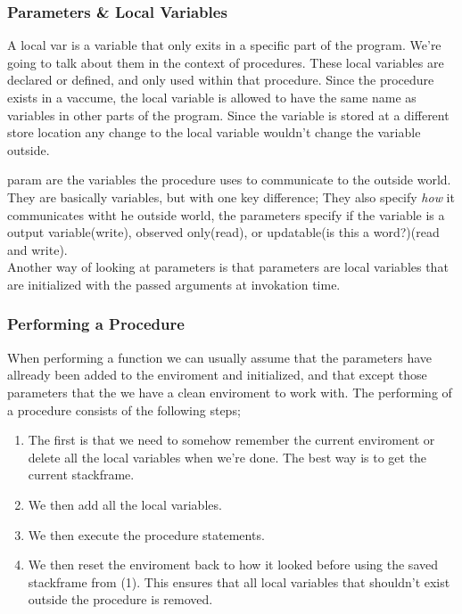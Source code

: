 \documentclass{article}
\begin{document}
    \subsubsection{Parameters \& Local Variables}
    A \gls{local var} is a variable that only exits in a specific part of the program. We're going to talk about them in the context of procedures.
    These local variables are declared or defined,  and only used within that procedure.
    Since the procedure exists in a vaccume, the local variable is allowed to have the same name as variables in other parts of the program. 
    Since the variable is stored at a different store location any change to the local variable wouldn't change the variable outside.

    \gls{param} are the variables the procedure uses to communicate to the outside world. They are basically variables, but with one key difference;
    They also specify \textit{how} it communicates witht he outside world, the parameters specify if the variable is a output variable(write), observed only(read), or updatable(is this a word?)(read and write).\\
    Another way of looking at parameters is that parameters are  local variables that are initialized with the passed arguments at invokation time.
    \subsubsection{Performing a Procedure}
        When performing a function we can usually assume that the parameters have allready been added to the enviroment and initialized, and that except those parameters that the we have a clean
        enviroment to work with.
        The performing of a procedure consists of the following steps;
        \begin{enumerate}
            \item The first is that we need to somehow remember the current enviroment or delete all the local variables when we're done.
                The best way is to get the current \gls{stackframe}.
            \item We then add all the local variables.
            \item We then execute the procedure statements.
            \item We then reset the enviroment back to how it looked before using the saved stackframe from (1). This ensures that all local variables
                that shouldn't exist outside the procedure is removed. 
        \end{enumerate}
\end{document}
